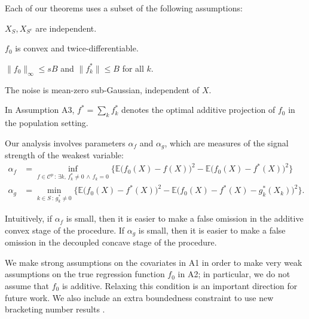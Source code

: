 Each of our theorems uses a subset of the following assumptions:
\begin{packed_enum}
\item[A1:] $X_S, X_{S^c}$ are independent. 
\item[A2:] $f_0$ is convex and twice-differentiable. 
\item[A3:] $\|f_0\|_\infty \leq sB$ and $\|f^*_k \| \leq B$ for all $k$.
\item[A4:] The noise is mean-zero sub-Gaussian, independent of $X$.
\end{packed_enum}
In Assumption A3, $f^*=\sum_k f^*_k$ denotes the optimal additive projection of $f_0$ in the population setting.

Our analysis involves parameters $\alpha_f$ and $\alpha_g$,
which are measures of the signal strength of the weakest variable:
\begin{align*}
\alpha_f &= \inf_{f \in \mathcal{C}^p \,:\, \exists k ,\, f^*_k \neq 0 \,\wedge\, f_k = 0} 
       \Big\{ \mathbb{E} \big( f_0(X) - f(X) \big)^2 - 
        \mathbb{E} \big( f_0(X) - f^*(X) \big)^2  \Big\}\\
\alpha_g &=   \min_{k \in S \,:\, g^*_k \neq 0}
      \Big\{ \mathbb{E} \big( f_0(X) - f^*(X) \big)^2 - 
    \mathbb{E} \big( f_0(X) - f^*(X) - g^*_k(X_k) \big)^2 \Big\}.
\end{align*}

Intuitively, if $\alpha_f$ is small, then it is easier to make a
false omission in the additive convex stage of the procedure. If
$\alpha_g$ is small, then it is easier to make a false omission in
the decoupled concave stage of the procedure.

We make strong assumptions on the covariates in A1 in order to make
very weak assumptions on the true regression function $f_0$ in
A2; in particular, we do not assume that $f_0$ is additive. 
Relaxing this condition is an important direction for future work.
We also include an extra
boundedness constraint to use new bracketing number
results \citep{kim2014global}.

